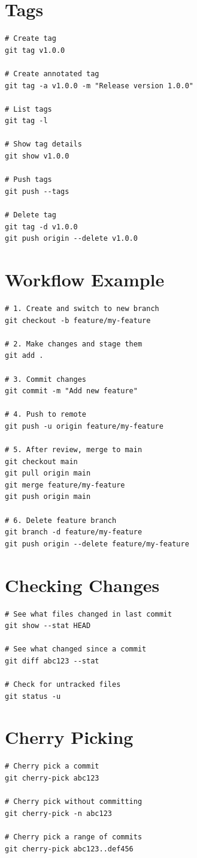 \documentclass[12pt,a4paper]{article}
\begin{document}
\section{Tags}
\begin{lstlisting}[style=bash]
# Create tag
git tag v1.0.0

# Create annotated tag
git tag -a v1.0.0 -m "Release version 1.0.0"

# List tags
git tag -l

# Show tag details
git show v1.0.0

# Push tags
git push --tags

# Delete tag
git tag -d v1.0.0
git push origin --delete v1.0.0
\end{lstlisting}

\section{Workflow Example}
\begin{lstlisting}[style=bash]
# 1. Create and switch to new branch
git checkout -b feature/my-feature

# 2. Make changes and stage them
git add .

# 3. Commit changes
git commit -m "Add new feature"

# 4. Push to remote
git push -u origin feature/my-feature

# 5. After review, merge to main
git checkout main
git pull origin main
git merge feature/my-feature
git push origin main

# 6. Delete feature branch
git branch -d feature/my-feature
git push origin --delete feature/my-feature
\end{lstlisting}

\section{Checking Changes}
\begin{lstlisting}[style=bash]
# See what files changed in last commit
git show --stat HEAD

# See what changed since a commit
git diff abc123 --stat

# Check for untracked files
git status -u
\end{lstlisting}

\section{Cherry Picking}
\begin{lstlisting}[style=bash]
# Cherry pick a commit
git cherry-pick abc123

# Cherry pick without committing
git cherry-pick -n abc123

# Cherry pick a range of commits
git cherry-pick abc123..def456
\end{lstlisting}
\end{document}
